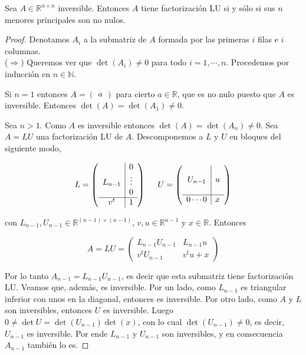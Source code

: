 \begin{propo}
\label{propo:lu}

Sea $A \in \mathbb{R}^{n \times n}$ inversible. Entonces $A$ tiene factorización LU si y sólo si sus $n$ menores principales son no nulos.

\begin{proof}
Denotamos $A_i$ a la submatriz de $A$ formada por las primeras $i$ filas e $i$ columnas.\\[0.25cm]
($\Rightarrow$) Queremos ver que $\det(A_i) \neq 0$ para todo $i = 1, \cdots, n$. Procedemos por inducción en $n \in \mathbb{N}$.

Si $n = 1$ entonces $A = \begin{pmatrix} a \end{pmatrix}$ para cierto $a \in \mathbb{R}$, que es no nulo puesto que $A$ es inversible. Entonces $\det(A) = \det(A_1) \neq 0$.

Sea $n > 1$. Como $A$ es inversible entonces $\det(A) = \det(A_n) \neq 0$. Sea $A = LU$ una factorización LU de $A$. Descomponemos a $L$ y $U$ en bloques del siguiente modo,

\[L = \left(\begin{array}{c|c}
 & 0 \\
L_{n - 1} & \vdots \\
 & 0 \\ \hline
v^t & 1
\end{array}\right)
\hspace{0.5cm}
U = \left(\begin{array}{c|c}
 &  \\
U_{n - 1} & u \\
 &  \\ \hline
0 \cdots 0 & x
\end{array}\right)
\]

con $L_{n - 1}, U_{n - 1} \in \mathbb{R}^{(n - 1) \times (n - 1)}$, $v, u \in \mathbb{R}^{n - 1}$ y $x \in \mathbb{R}$. Entonces

\[A = LU = \left(\begin{array}{c|c}
L_{n - 1} U_{n - 1} & L_{n - 1}u\\ \hline
v^t U_{n - 1} & v^tu + x
\end{array}\right)\]

Por lo tanto $A_{n - 1} = L_{n - 1}U_{n - 1}$, es decir que esta submatriz tiene factorización LU. Veamos que, además, es inversible. Por un lado, como $L_{n - 1}$ es triangular inferior con unos en la diagonal, entonces es inversible. Por otro lado, como $A$ y $L$ son inversibles, entonces $U$ es inversible. Luego $0 \neq \det U = \det(U_{n - 1}) \det(x)$, con lo cual $\det(U_{n - 1}) \neq 0$, es decir, $U_{n - 1}$ es inversible. Por ende $L_{n - 1}$ y $U_{n - 1}$ son inversibles, y en consecuencia $A_{n - 1}$ también lo es.


\end{proof}
\end{propo}
